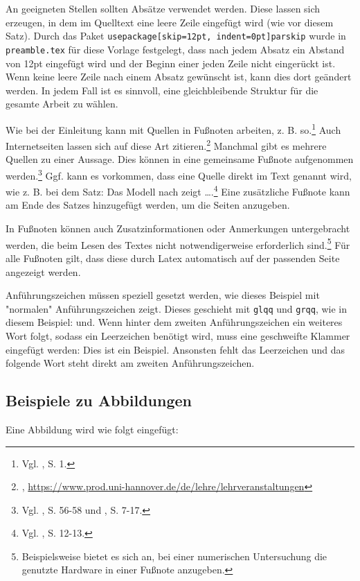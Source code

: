 An geeigneten Stellen sollten Absätze verwendet werden. Diese lassen sich erzeugen, in dem im Quelltext eine leere Zeile eingefügt wird (wie vor diesem Satz). Durch das Paket \texttt{usepackage[skip=12pt, indent=0pt]{parskip}} wurde in \texttt{preamble.tex} für diese Vorlage festgelegt, dass nach jedem Absatz ein Abstand von 12pt eingefügt wird und der Beginn einer jeden Zeile nicht eingerückt ist. Wenn keine leere Zeile nach einem Absatz gewünscht ist, kann dies dort geändert werden. In jedem Fall ist es sinnvoll, eine gleichbleibende Struktur für die gesamte Arbeit zu wählen.

Wie bei der Einleitung kann mit Quellen in Fußnoten arbeiten, z. B. so.\footnote{Vgl. \textcite{beispielname2024beispieltitel}, S. 1.} Auch Internetseiten lassen sich auf diese Art zitieren.\footnote{\textcite{insitutprod}, \url{https://www.prod.uni-hannover.de/de/lehre/lehrveranstaltungen}} Manchmal gibt es mehrere Quellen zu einer Aussage. Dies können in eine gemeinsame Fußnote aufgenommen werden.\footnote{Vgl. \textcite{beispielname2024beispieltitel}, S. 56-58 und \textcite{beispielname2024beispieltitel2}, S. 7-17.} Ggf. kann es vorkommen, dass eine Quelle direkt im Text genannt wird, wie z. B. bei dem Satz: Das Modell nach \textcite{sudbeck2024using} zeigt \dots.\footnote{Vgl. \textcite{sudbeck2024using}, S. 12-13.} Eine zusätzliche Fußnote kann am Ende des Satzes hinzugefügt werden, um die Seiten anzugeben.

 In Fußnoten können auch Zusatzinformationen oder Anmerkungen untergebracht werden, die beim Lesen des Textes nicht notwendigerweise erforderlich sind.\footnote{Beispielsweise bietet es sich an, bei einer numerischen Untersuchung die genutzte Hardware in einer Fußnote anzugeben.} Für alle Fußnoten gilt, dass diese durch Latex automatisch auf der passenden Seite angezeigt werden.

Anführungszeichen müssen speziell gesetzt werden, wie dieses Beispiel mit "normalen" Anführungszeichen zeigt. Dieses geschieht mit \texttt{glqq} und \texttt{grqq}, wie in diesem Beispiel: \glqq und\grqq. Wenn hinter dem zweiten Anführungszeichen ein weiteres Wort folgt, sodass ein Leerzeichen benötigt wird, muss eine geschweifte Klammer eingefügt werden: Dies ist \glqq ein\grqq{} Beispiel. Ansonsten fehlt das Leerzeichen und das folgende Wort steht direkt am zweiten Anführungszeichen.


\subsection{Beispiele zu Abbildungen}
Eine Abbildung wird wie folgt eingefügt:
    
